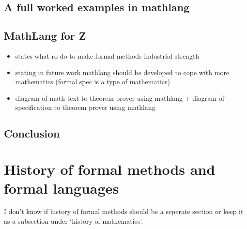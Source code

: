 \subsection{A full worked examples in mathlang}

\subsection{MathLang for Z}

\begin{itemize}
\item \cite{fmpresetation} states what ro do to make formal methods industrial strength

\item \cite{lamarphd} stating in future work mathlang should be developed to cope with more mathematics (formal spec is a type of mathematics)

\item diagram of math text to theorem prover using mathlang + diagram of specification to theorem prover using mathlang
\end{itemize}

\subsection{Conclusion}

\section{History of formal methods and formal languages}

{\color{red}I don't know if history of formal methods should be a seperate section or keep it as a subsection under `history of mathematics'.}

